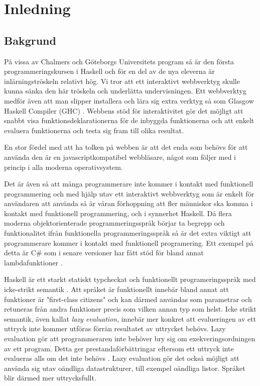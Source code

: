 ﻿\section{Inledning}

\subsection{Bakgrund}
På vissa av Chalmers och Göteborgs Universitets program så är den första programmeringskursen i Haskell \citep{haskell98} och för en del av de nya eleverna är inlärningströskeln relativt hög. Vi tror att ett interaktivt webbverktyg skulle kunna sänka den här tröskeln och underlätta undervisningen. Ett webbverktyg medför även att man slipper installera och lära sig extra verktyg så som Glasgow Haskell Compiler (GHC) \citep{ghc}. Webbens stöd för interaktivitet gör det möjligt att snabbt visa funktionsdeklarationerna för de inbyggda funktionerna och att enkelt evaluera funktionerna och testa sig fram till olika resultat. 

En stor fördel med att ha tolken på webben är att det enda som behövs för att använda den är en javascriptkompatibel webbläsare, något som följer med i princip i alla moderna operativsystem.

Det är även så att många programmerare inte kommer i kontakt med funktionell programmering  och med hjälp utav ett interaktivt webbverktyg som är enkelt för användaren att använda så är våran förhoppning att fler människor ska komma i kontakt med funktionell programmering, och i synnerhet Haskell. Då flera moderna objektorienterade programmeringsspråk börjar ta begrepp och funktionalitet ifrån funktionella programmeringsspråk så är det extra viktigt att programmerare kommer i kontakt med funktionell programering. Ett exempel på detta är C\# som i senare versioner har fått stöd för bland annat lambdafunktioner \citep{csharp}. 


Haskell är ett starkt statiskt typcheckat och funktionellt programeringsspråk med icke-strikt semantik . 
Att språket är funktionellt innebär bland annat att funktioner är "first-class citizens" och kan därmed användas som parametrar och retuneras från andra funktioner precis som vilken annan typ som helst.
Icke strikt semantik, även kallat \emph{lazy evaluation}, innebär mer konkret att evalueringen av ett uttryck inte kommer utföras förrän resultatet av uttrycket behövs.
Lazy evaluation gör att programmeraren inte behöver bry sig om exekveringsordningen av ett program. Detta ger prestandaförbättringar eftersom ett uttryck inte evalueras alls om det inte behövs \citep{hudak89}.
Lazy evaluation gör det också möjligt att använda sig utav oändliga datastrukturer, till exempel oändliga listor. Språket blir därmed mer uttrycksfullt. 

